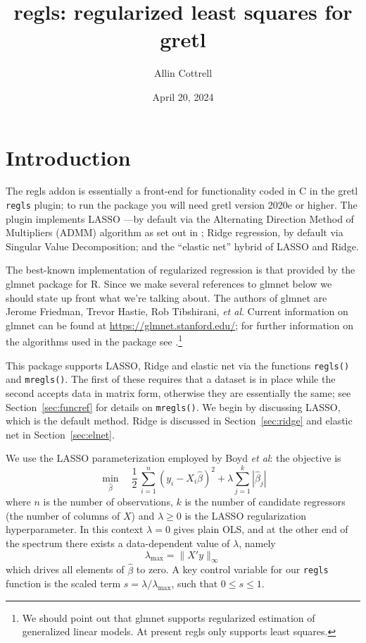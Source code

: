 \documentclass{article}
\title{\textsf{regls}: regularized least squares for gretl}
\author{Allin Cottrell}
\date{April 20, 2024}
\begin{document}
\maketitle

\section{Introduction}
\label{sec:intro}

The \textsf{regls} addon is essentially a front-end for functionality
coded in C in the gretl \texttt{regls} plugin; to run the package you
will need gretl version 2020e or higher.  The plugin implements LASSO
\citep{tibshirani96}---by default via the Alternating Direction Method
of Multipliers (ADMM) algorithm as set out in \cite{boyd2010}; Ridge
regression, by default via Singular Value Decomposition; and the
``elastic net'' hybrid of LASSO and Ridge.

The best-known implementation of regularized regression is that
provided by the \textsf{glmnet} package for \textsf{R}. Since we make
several references to \textsf{glmnet} below we should state up front
what we're talking about. The authors of \textsf{glmnet} are Jerome
Friedman, Trevor Hastie, Rob Tibshirani, \textit{et al}.  Current
information on \textsf{glmnet} can be found at
\url{https://glmnet.stanford.edu/}; for further information on the
algorithms used in the package see \cite{glmnet10}.\footnote{We should
  point out that \textsf{glmnet} supports regularized estimation of
  generalized linear models. At present \textsf{regls} only supports
  least squares.}

This package supports LASSO, Ridge and elastic net via the functions
\texttt{regls()} and \texttt{mregls()}. The first of these requires
that a dataset is in place while the second accepts data in matrix
form, otherwise they are essentially the same; see
Section~\ref{sec:funcref} for details on \texttt{mregls()}.  We begin
by discussing LASSO, which is the default method.  Ridge is discussed
in Section~\ref{sec:ridge} and elastic net in Section~\ref{sec:elnet}.

We use the LASSO parameterization employed by Boyd \textit{et al}: the
objective is
\begin{equation}
  \label{eq:obj}
  \min_{\hat{\beta}} \quad \frac{1}{2}\,
  \sum_{i=1}^n (y_i - X_i\hat{\beta})^2 + \lambda \sum_{j=1}^k |\hat{\beta}_j|
\end{equation}
where $n$ is the number of observations, $k$ is the number of
candidate regressors (the number of columns of $X$) and
$\lambda \geq 0$ is the LASSO regularization hyperparameter. In this
context $\lambda = 0$ gives plain OLS, and at the other end of the
spectrum there exists a data-dependent value of $\lambda$, namely
\begin{equation}
  \label{eq:lmax}
  \lambda_{\max} = \|X'y\|_{\infty}
\end{equation}
which drives all elements of $\hat{\beta}$ to zero.  A key control
variable for our \texttt{regls} function is the scaled term
$s = \lambda/\lambda_{\max}$, such that $0 \leq s \leq 1$.
\end{document}
